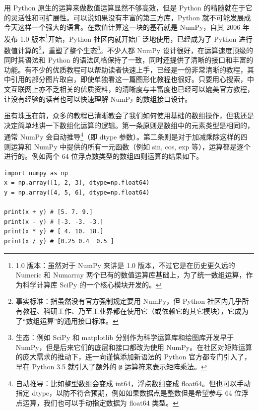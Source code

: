 用 Python 原生的运算来做数值运算显然不够高效，但是 Python 的精髓就在于它的灵活性和可扩展性。可以说如果没有丰富的第三方库，Python 就不可能发展成今天这样一个强大的语言。在数值计算这一块的基石就是 NumPy，自其 2006 年发布 1.0 版本\footnote{1.0 版本：虽然对于 NumPy 来讲是 1.0 版本，不过它是在历史更久远的 Numeric 和 Numarray 两个已有的数值运算库基础上，为了统一数组运算，作为科学计算库 SciPy 的一个核心模块开发的。}开始，Python 社区内就开始广泛地使用，已经成为了 Python 进行数值计算的\footnote{事实标准：指虽然没有官方强制规定要用 NumPy，但 Python 社区内几乎所有教程、科研工作、乃至工业界都在使用它（或依赖它的其它模块），它成为了“数组运算”的通用接口标准。}，重塑了整个生态\footnote{生态：例如 SciPy 和 matplotlib 分别作为科学运算库和绘图库开发早于 NumPy，但是后来它们的底层和接口都改为使用 NumPy。在社区对矩阵运算的庞大需求的推动下，连一向谨慎添加新语法的 Python 官方都专门引入了，早在 Python 3.5 就引入了额外的 \texttt{@} 运算符来表示矩阵乘法。}。不少人都 NumPy 设计很好，在运算速度顶级的同时其语法和 Python 的语法风格保持了一致，同时还提供了清晰的接口和丰富的功能。有不少的优质教程可以帮助读者快速上手，已经是一份非常清晰的教程，其中引用的部分图片取自，即使单独看这一篇图形化教程也很好。只要用心搜索，中文互联网上亦不乏相关的优质资料，的清晰度与丰富度也已经可以媲美官方教程，让没有经验的读者也可以快速理解 NumPy 的数组接口设计。

虽有珠玉在前，众多的教程已清晰教会了我们如何使用基础的数组操作，但我还是决定简单地讲一下数组化运算的逻辑。第一条原则是数组中的元素类型是相同的，通常 NumPy 会自动推导\footnote{自动推导：比如整型数组会变成 int64，浮点数组变成 float64。但也可以手动指定 dtype，以防不符合预期，例如如果数据点是整数但是希望参与 64 位浮点运算，我们也可以手动指定数据为 float64 类型。}（即 dtype 参数）。第二条则是对于加减乘除这样的四则运算和 NumPy 中提供的所有一元函数（例如 sin, cos, exp 等），运算都是逐个进行的。例如两个 64 位浮点数类型的数组四则运算的结果如下。
\begin{verbatim}
import numpy as np
x = np.array([1, 2, 3], dtype=np.float64)
y = np.array([4, 5, 6], dtype=np.float64)

print(x + y) # [5. 7. 9.]
print(x - y) # [-3. -3. -3.]
print(x * y) # [ 4. 10. 18.]
print(x / y) # [0.25 0.4  0.5 ]
\end{verbatim}

